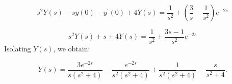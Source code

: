 \documentclass[11pt]{article}
\begin{document}
\begin{solution}
\begin{equation*}
s^2 Y(s) - s y(0)-y^{\prime}(0) +4 Y(s) = \frac{1}{s^{2}}+ \left( \frac{3}{s}-\frac{1}{s^{2}} \right)e^{-2s}
\end{equation*}


\begin{equation*}
s^2 Y(s) + s +4 Y(s) =\frac{1}{s^{2}}+ \frac{3s-1}{s^{2}} e^{-2s}
\end{equation*}
Isolating $Y(s)$, we obtain:

\begin{equation*}
\boxed{Y(s) = \dfrac{3e^{-2s}}{s(s^2+4)} -\dfrac{e^{-2s}}{s^2(s^2+4)} + \dfrac{1}{s^2(s^2+4)} -\dfrac{s}{s^2+4}}.
\end{equation*}
\end{solution}
\end{document}
